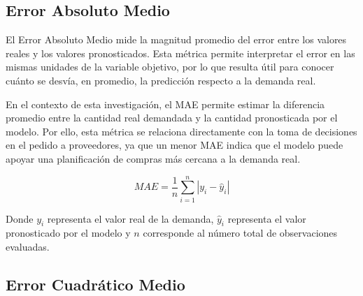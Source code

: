     
    

\subsection{Error Absoluto Medio}

El Error Absoluto Medio mide la magnitud promedio del error entre los valores reales y los valores pronosticados. Esta métrica permite interpretar el error en las mismas unidades de la variable objetivo, por lo que resulta útil para conocer cuánto se desvía, en promedio, la predicción respecto a la demanda real.

En el contexto de esta investigación, el MAE permite estimar la diferencia promedio entre la cantidad real demandada y la cantidad pronosticada por el modelo. Por ello, esta métrica se relaciona directamente con la toma de decisiones en el pedido a proveedores, ya que un menor MAE indica que el modelo puede apoyar una planificación de compras más cercana a la demanda real.

\begin{equation}
MAE = \frac{1}{n}\sum_{i=1}^{n}|y_i-\hat{y}_i|
\end{equation}

Donde $y_i$ representa el valor real de la demanda, $\hat{y}_i$ representa el valor pronosticado por el modelo y $n$ corresponde al número total de observaciones evaluadas.

\subsection{Error Cuadrático Medio}


